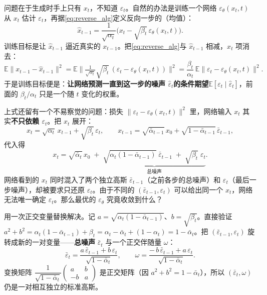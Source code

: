 问题在于生成时手上只有 $x_t$，不知道 $\varepsilon_t$。自然的办法是训练一个网络 $\varepsilon_\theta(x_t,t)$ 从 $x_t$ 估计 $\varepsilon_t$，再据\eqref{eq:reverse_alg}定义反向一步的（均值）：
\begin{equation}\label{eq:ddpm_reverse}
\hat x_{t-1} = \frac{1}{\sqrt{\alpha_t}}\big(x_t - \sqrt{\beta_t}\,\varepsilon_\theta(x_t,t)\big).
\end{equation}
训练目标是让 $\hat x_{t-1}$ 逼近真实的 $x_{t-1}$。把\eqref{eq:reverse_alg}与 $\hat x_{t-1}$ 相减，$x_t$ 项消去：
\begin{equation}\label{eq:ddpm_loss}
\mathbb E\big\|x_{t-1}-\hat x_{t-1}\big\|^2
= \mathbb E\Big\|\tfrac{1}{\sqrt{\alpha_t}}\sqrt{\beta_t}\,(\varepsilon_t-\varepsilon_\theta(x_t,t))\Big\|^2
= \frac{\beta_t}{\alpha_t}\,\mathbb E\big\|\varepsilon_t-\varepsilon_\theta(x_t,t)\big\|^2.
\end{equation}
于是训练目标便是：\textbf{让网络预测一直到这一步的噪声 $\hat\varepsilon_t$的条件期望$\mathbb{E}[\varepsilon_t\mid\hat\varepsilon_t]$}，前面的 $\beta_t/\alpha_t$ 只是一个随 $t$ 变化的权重。

上式还留有一个不易察觉的问题：损失 $\|\varepsilon_t-\varepsilon_\theta(x_t,t)\|^2$ 里，网络输入 $x_t$ 其实\textbf{不只依赖 $\varepsilon_t$}。把 $x_t$ 展开：
\begin{equation}
x_t = \sqrt{\alpha_t}\,x_{t-1}+\sqrt{\beta_t}\,\varepsilon_t,\qquad
x_{t-1} = \sqrt{\bar\alpha_{t-1}}\,x_0 + \sqrt{1-\bar\alpha_{t-1}}\,\bar\varepsilon_{t-1},
\end{equation}
代入得
\begin{equation}
x_t = \sqrt{\bar\alpha_t}\,x_0 \;+\; \underbrace{\sqrt{\alpha_t(1-\bar\alpha_{t-1})}\;\bar\varepsilon_{t-1} \;+\; \sqrt{\beta_t}\;\varepsilon_t}_{\text{总噪声}}.
\end{equation}
网络看到的 $x_t$ 同时混入了两个独立高斯 $\bar\varepsilon_{t-1}$（之前各步的总噪声）和 $\varepsilon_t$（最后一步噪声），却被要求只还原 $\varepsilon_t$。由于不同的 $(\bar\varepsilon_{t-1},\varepsilon_t)$ 可以给出同一个 $x_t$，网络无法唯一确定 $\varepsilon_t$。那么最优的 $\varepsilon_\theta$ 究竟收敛到什么？

用一次正交变量替换解决。记 $a=\sqrt{\alpha_t(1-\bar\alpha_{t-1})}$、$b=\sqrt{\beta_t}$。直接验证 $a^2+b^2 = \alpha_t(1-\bar\alpha_{t-1})+\beta_t = \alpha_t-\bar\alpha_t+(1-\alpha_t) = 1-\bar\alpha_t$。把 $(\bar\varepsilon_{t-1},\varepsilon_t)$ 旋转成新的一对变量——\textbf{总噪声} $\bar\varepsilon_t$ 与一个正交伴随量 $\omega$：
\begin{equation}
\bar\varepsilon_t = \frac{a\,\bar\varepsilon_{t-1}+b\,\varepsilon_t}{\sqrt{1-\bar\alpha_t}},
\qquad
\omega = \frac{-\,b\,\bar\varepsilon_{t-1}+a\,\varepsilon_t}{\sqrt{1-\bar\alpha_t}}.
\end{equation}
变换矩阵 $\dfrac{1}{\sqrt{1-\bar\alpha_t}}\begin{pmatrix}a&b\\-b&a\end{pmatrix}$ 是正交矩阵（因 $a^2+b^2=1-\bar\alpha_t$），所以 $(\bar\varepsilon_t,\omega)$ 仍是一对相互独立的标准高斯。


